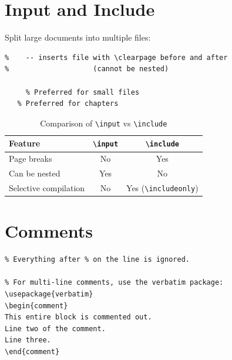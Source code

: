 \section{Input and Include}

Split large documents into multiple files:

\begin{lstlisting}[language={[LaTeX]TeX}, caption=File inclusion commands]
%      -- inserts file content inline (no page break)
%    -- inserts file with \clearpage before and after
%                    (cannot be nested)

     % Preferred for small files
   % Preferred for chapters
\end{lstlisting}

\begin{table}[H]
\centering
\begin{tabular}{lcc}
\toprule
\textbf{Feature} & \textbf{\texttt{\textbackslash input}} & \textbf{\texttt{\textbackslash include}} \\
\midrule
Page breaks    & No  & Yes \\
Can be nested  & Yes & No  \\
Selective compilation & No & Yes (\texttt{\textbackslash includeonly}) \\
\bottomrule
\end{tabular}
\caption{Comparison of \texttt{\textbackslash input} vs \texttt{\textbackslash include}}
\end{table}

\section{Comments}

\begin{lstlisting}[language={[LaTeX]TeX}, caption=Comments in LaTeX]
% This is a single-line comment.
% Everything after % on the line is ignored.

% For multi-line comments, use the verbatim package:
\usepackage{verbatim}
\begin{comment}
This entire block is commented out.
Line two of the comment.
Line three.
\end{comment}
\end{lstlisting}

